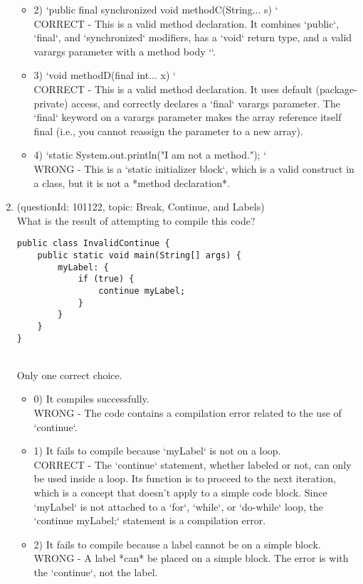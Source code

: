 \documentclass[12pt]{article}
\begin{document}
\begin{enumerate}[label=(\arabic*)]
\begin{itemize}
\item 2) `public final synchronized void methodC(String... s) {}`
 \\ 
CORRECT - This is a valid method declaration. It combines `public`, `final`, and `synchronized` modifiers, has a `void` return type, and a valid varargs parameter with a method body `{}`.

\item 3) `void methodD(final int... x) {}`
 \\ 
CORRECT - This is a valid method declaration. It uses default (package-private) access, and correctly declares a `final` varargs parameter. The `final` keyword on a varargs parameter makes the array reference itself final (i.e., you cannot reassign the parameter to a new array).

\item 4) `static { System.out.println("I am not a method."); }`
 \\ 
WRONG - This is a `static initializer block`, which is a valid construct in a class, but it is not a *method declaration*.

\end{itemize}
\item (questionId: 101122, topic: Break, Continue, and Labels) \\ 
What is the result of attempting to compile this code?\n\begin{verbatim}
public class InvalidContinue {
    public static void main(String[] args) {
        myLabel: {
            if (true) {
                continue myLabel; 
            }
        }
    }
}
\end{verbatim}
\\ \noindent Only one correct choice. 
\begin{itemize}
\item 0) It compiles successfully.
 \\ 
WRONG - The code contains a compilation error related to the use of `continue`.

\item 1) It fails to compile because `myLabel` is not on a loop.
 \\ 
CORRECT - The `continue` statement, whether labeled or not, can only be used inside a loop. Its function is to proceed to the next iteration, which is a concept that doesn't apply to a simple code block. Since `myLabel` is not attached to a `for`, `while`, or `do-while` loop, the `continue myLabel;` statement is a compilation error.

\item 2) It fails to compile because a label cannot be on a simple block.
 \\ 
WRONG - A label *can* be placed on a simple block. The error is with the `continue`, not the label.


\end{itemize}
\end{enumerate}
\end{document}
